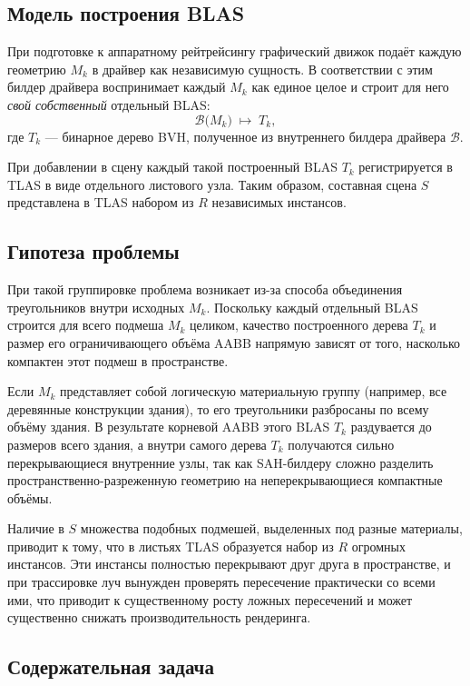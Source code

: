 \subsection{Модель построения BLAS}

При подготовке к аппаратному рейтрейсингу графический движок подаёт каждую геометрию $M_k$ в драйвер как независимую сущность. В соответствии с этим билдер драйвера воспринимает каждый $M_k$ как единое целое и строит для него \emph{свой собственный} отдельный BLAS:
\begin{equation}
    \mathcal{B}\bigl(M_k\bigr) \;\longmapsto\; T_k,
\end{equation}
где $T_k$ --- бинарное дерево BVH, полученное из внутреннего билдера драйвера $\mathcal{B}$. 

При добавлении в сцену каждый такой построенный BLAS $T_k$ регистрируется в TLAS в виде отдельного листового узла. Таким образом, составная сцена $S$ представлена в TLAS набором из $R$ независимых инстансов.

\subsection{Гипотеза проблемы}

При такой группировке проблема возникает из-за способа объединения треугольников внутри исходных $M_k$. Поскольку каждый отдельный BLAS строится для всего подмеша $M_k$ целиком, качество построенного дерева $T_k$ и размер его ограничивающего объёма AABB напрямую зависят от того, насколько компактен этот подмеш в пространстве.

Если $M_k$ представляет собой логическую материальную группу (например, все деревянные конструкции здания), то его треугольники разбросаны по всему объёму здания. В результате корневой AABB этого BLAS $T_k$ раздувается до размеров всего здания, а внутри самого дерева $T_k$ получаются сильно перекрывающиеся внутренние узлы, так как SAH-билдеру сложно разделить пространственно-разреженную геометрию на неперекрывающиеся компактные объёмы.

Наличие в $S$ множества подобных подмешей, выделенных под разные материалы, приводит к тому, что в листьях TLAS образуется набор из $R$ огромных инстансов. Эти инстансы полностью перекрывают друг друга в пространстве, и при трассировке луч вынужден проверять пересечение практически со всеми ими, что приводит к существенному росту ложных пересечений и может существенно снижать производительность рендеринга.

\subsection{Содержательная задача}

